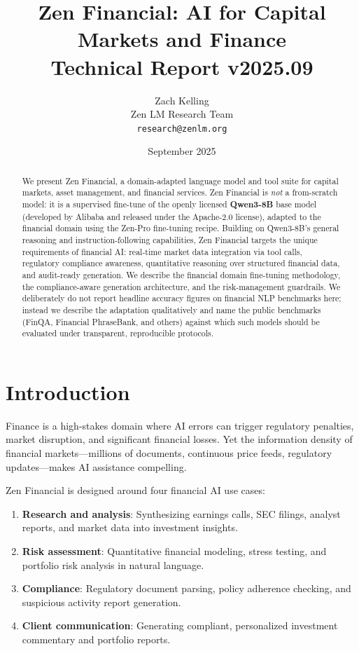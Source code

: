 \documentclass[11pt,a4paper]{article}
\title{\textbf{Zen Financial: AI for Capital Markets and Finance}\\
\large Technical Report v2025.09}
\author{Zach Kelling \\ Zen LM Research Team\\
\texttt{research@zenlm.org}}
\date{September 2025}
\begin{document}
\maketitle

\begin{abstract}
We present Zen Financial, a domain-adapted language model and tool suite for capital markets, asset management, and financial services. Zen Financial is \emph{not} a from-scratch model: it is a supervised fine-tune of the openly licensed \textbf{Qwen3-8B} base model (developed by Alibaba and released under the Apache-2.0 license), adapted to the financial domain using the Zen-Pro fine-tuning recipe. Building on Qwen3-8B's general reasoning and instruction-following capabilities, Zen Financial targets the unique requirements of financial AI: real-time market data integration via tool calls, regulatory compliance awareness, quantitative reasoning over structured financial data, and audit-ready generation. We describe the financial domain fine-tuning methodology, the compliance-aware generation architecture, and the risk-management guardrails. We deliberately do not report headline accuracy figures on financial NLP benchmarks here; instead we describe the adaptation qualitatively and name the public benchmarks (FinQA, Financial PhraseBank, and others) against which such models should be evaluated under transparent, reproducible protocols.
\end{abstract}

\section{Introduction}

Finance is a high-stakes domain where AI errors can trigger regulatory penalties, market disruption, and significant financial losses. Yet the information density of financial markets—millions of documents, continuous price feeds, regulatory updates—makes AI assistance compelling.

Zen Financial is designed around four financial AI use cases:

\begin{enumerate}
  \item \textbf{Research and analysis}: Synthesizing earnings calls, SEC filings, analyst reports, and market data into investment insights.
  \item \textbf{Risk assessment}: Quantitative financial modeling, stress testing, and portfolio risk analysis in natural language.
  \item \textbf{Compliance}: Regulatory document parsing, policy adherence checking, and suspicious activity report generation.
  \item \textbf{Client communication}: Generating compliant, personalized investment commentary and portfolio reports.
\end{enumerate}
\end{document}
